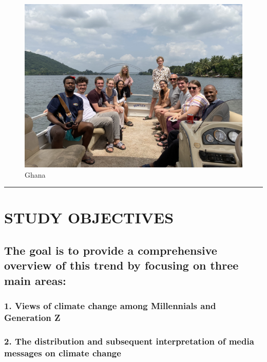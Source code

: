 \documentclass[
]{article}
\begin{document}
\begin{figure}
\centering
\includegraphics{IMG_0998.jpg}
\caption{Ghana}
\end{figure}

\begin{center}\rule{0.5\linewidth}{0.5pt}\end{center}

\hypertarget{study-objectives}{%
\section{STUDY OBJECTIVES}\label{study-objectives}}

\hypertarget{the-goal-is-to-provide-a-comprehensive-overview-of-this-trend-by-focusing-on-three-main-areas}{%
\subsection{The goal is to provide a comprehensive overview of this
trend by focusing on three main
areas:}\label{the-goal-is-to-provide-a-comprehensive-overview-of-this-trend-by-focusing-on-three-main-areas}}

\hypertarget{views-of-climate-change-among-millennials-and-generation-z}{%
\subsubsection{1. Views of climate change among Millennials and
Generation
Z}\label{views-of-climate-change-among-millennials-and-generation-z}}

\hypertarget{the-distribution-and-subsequent-interpretation-of-media-messages-on-climate-change}{%
\subsubsection{2. The distribution and subsequent interpretation of
media messages on climate
change}\label{the-distribution-and-subsequent-interpretation-of-media-messages-on-climate-change}}
\end{document}

